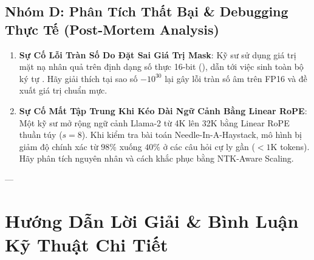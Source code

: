 \subsection{Nhóm D: Phân Tích Thất Bại \& Debugging Thực Tế (Post-Mortem Analysis)}
\begin{enumerate}
  \item \textbf{Sự Cố Lỗi Tràn Số Do Đặt Sai Giá Trị Mask}: Kỹ sư sử dụng giá trị mặt nạ nhân quả  trên định dạng số thực 16-bit (), dẫn tới việc sinh toàn bộ ký tự . Hãy giải thích tại sao số $-10^{30}$ lại gây lỗi tràn số âm trên FP16 và đề xuất giá trị chuẩn mực.
  \item \textbf{Sự Cố Mất Tập Trung Khi Kéo Dài Ngữ Cảnh Bằng Linear RoPE}: Một kỹ sư mở rộng ngữ cảnh Llama-2 từ 4K lên 32K bằng Linear RoPE thuần túy ($s = 8$). Khi kiểm tra bài toán Needle-In-A-Haystack, mô hình bị giảm độ chính xác từ $98\%$ xuống $40\%$ ở các câu hỏi cự ly gần ($< 1\text{K}$ tokens). Hãy phân tích nguyên nhân và cách khắc phục bằng NTK-Aware Scaling.
\end{enumerate}

---

\section{Hướng Dẫn Lời Giải \& Bình Luận Kỹ Thuật Chi Tiết}
\label{sec:ch06-solutions}

